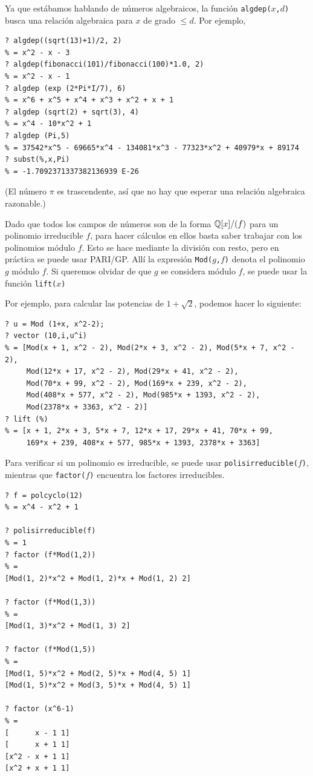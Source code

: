 \vspace{1em}

Ya que estábamos hablando de números algebraicos, la función
\texttt{algdep($x$,$d$)} busca una relación algebraica para $x$ de grado
$\le d$. Por ejemplo,
\begin{shaded}
\begin{verbatim}
? algdep((sqrt(13)+1)/2, 2)
% = x^2 - x - 3
? algdep(fibonacci(101)/fibonacci(100)*1.0, 2)
% = x^2 - x - 1
? algdep (exp (2*Pi*I/7), 6)
% = x^6 + x^5 + x^4 + x^3 + x^2 + x + 1
? algdep (sqrt(2) + sqrt(3), 4)
% = x^4 - 10*x^2 + 1
? algdep (Pi,5)
% = 37542*x^5 - 69665*x^4 - 134081*x^3 - 77323*x^2 + 40979*x + 89174
? subst(%,x,Pi)
% = -1.7092371337382136939 E-26
\end{verbatim}
(El número $\pi$ es trascendente, así que no hay que esperar una relación
algebraica razonable.)
\end{shaded}

Dado que todos los campos de números son de la forma $\mathbb{Q} [x]/(f)$ para
un polinomio irreducible $f$, para hacer cálculos en ellos basta saber trabajar
con los polinomios módulo $f$. Esto se hace mediante la división con resto, pero
en práctica se puede usar PARI/GP. Allí la expresión \texttt{Mod($g$,$f$)} denota
el polinomio $g$ módulo $f$. Si queremos olvidar de que $g$ se considera módulo
$f$, se puede usar la función \texttt{lift($x$)}

Por ejemplo, para calcular las potencias de $1 + \sqrt{2}$, podemos hacer
lo siguiente:
\begin{shaded}
\begin{verbatim}
? u = Mod (1+x, x^2-2);
? vector (10,i,u^i)
% = [Mod(x + 1, x^2 - 2), Mod(2*x + 3, x^2 - 2), Mod(5*x + 7, x^2 - 2),
     Mod(12*x + 17, x^2 - 2), Mod(29*x + 41, x^2 - 2),
     Mod(70*x + 99, x^2 - 2), Mod(169*x + 239, x^2 - 2),
     Mod(408*x + 577, x^2 - 2), Mod(985*x + 1393, x^2 - 2),
     Mod(2378*x + 3363, x^2 - 2)]
? lift (%)
% = [x + 1, 2*x + 3, 5*x + 7, 12*x + 17, 29*x + 41, 70*x + 99,
     169*x + 239, 408*x + 577, 985*x + 1393, 2378*x + 3363]
\end{verbatim}
\end{shaded}

Para verificar si un polinomio es irreducible, se puede usar
\texttt{polisirreducible($f$)}, mientras que \texttt{factor($f$)} encuentra los
factores irreducibles.
\begin{shaded}
\begin{verbatim}
? f = polcyclo(12)
% = x^4 - x^2 + 1

? polisirreducible(f)
% = 1
? factor (f*Mod(1,2))
% = 
[Mod(1, 2)*x^2 + Mod(1, 2)*x + Mod(1, 2) 2]

? factor (f*Mod(1,3))
% = 
[Mod(1, 3)*x^2 + Mod(1, 3) 2]

? factor (f*Mod(1,5))
% = 
[Mod(1, 5)*x^2 + Mod(2, 5)*x + Mod(4, 5) 1]
[Mod(1, 5)*x^2 + Mod(3, 5)*x + Mod(4, 5) 1]

? factor (x^6-1)
% = 
[      x - 1 1]
[      x + 1 1]
[x^2 - x + 1 1]
[x^2 + x + 1 1]
\end{verbatim}
\end{shaded}

